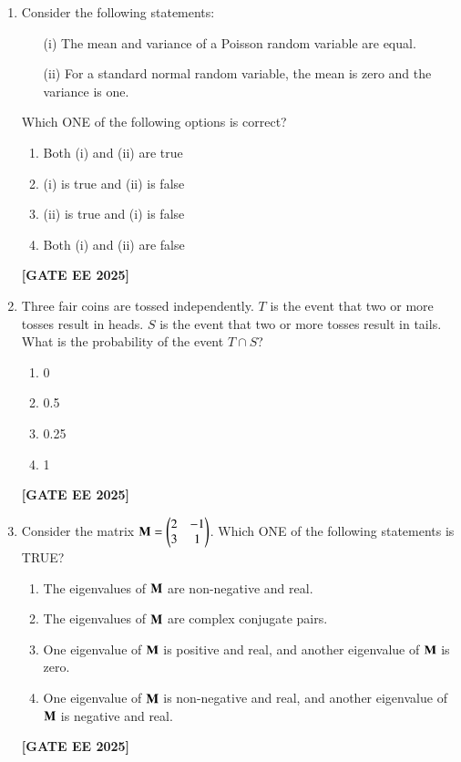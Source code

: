 \documentclass[journal]{IEEEtran}
\newcommand{\qfooter}{%
  \begin{flushright}\footnotesize\textbf{[GATE EE 2025]}\end{flushright}\vspace{1em}%
}
\begin{document}
\begin{enumerate}[leftmargin=*,label=\arabic*.]
\item Consider the following statements:
\begin{itemize}[leftmargin=*]
    \item[(i)] The mean and variance of a Poisson random variable are equal.
    \item[(ii)] For a standard normal random variable, the mean is zero and the variance is one.
\end{itemize}
Which ONE of the following options is correct?
\begin{multicols}{2}
\begin{enumerate}[label=(\Alph*)]
\item Both (i) and (ii) are true
\item (i) is true and (ii) is false
\item (ii) is true and (i) is false
\item Both (i) and (ii) are false
\end{enumerate} \qfooter
\end{multicols}

\item Three fair coins are tossed independently. $T$ is the event that two or more tosses result in heads. $S$ is the event that two or more tosses result in tails. What is the probability of the event $T \cap S$?
\begin{multicols}{4}
\begin{enumerate}[label=(\Alph*)]
\item 0
\item 0.5
\item 0.25
\item 1
\end{enumerate} 
\qfooter
\end{multicols}

\item Consider the matrix $\mathbf{M} = \begin{pmatrix}2 & -1\\3 & 1\end{pmatrix}$. Which ONE of the following statements is TRUE?

\begin{enumerate}[label=(\Alph*)]
\item The eigenvalues of $\mathbf{M}$ are non-negative and real.
\item The eigenvalues of $\mathbf{M}$ are complex conjugate pairs.
\item One eigenvalue of $\mathbf{M}$ is positive and real, and another eigenvalue of $\mathbf{M}$ is zero.
\item One eigenvalue of $\mathbf{M}$ is non-negative and real, and another eigenvalue of $\mathbf{M}$ is negative and real.
\end{enumerate} 
\qfooter



\end{enumerate}
\end{document}
